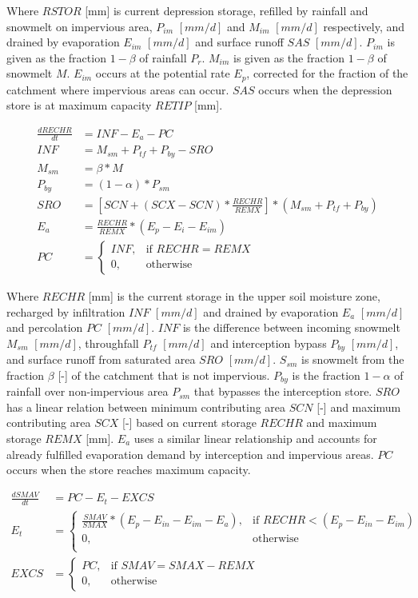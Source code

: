 Where $RSTOR$ [mm] is current depression storage, refilled by rainfall and snowmelt on impervious area, $P_{im}$ $[mm/d]$ and $M_{im}$ $[mm/d]$ respectively, and drained by evaporation $E_{im}$  $[mm/d]$ and surface runoff $SAS$ $[mm/d]$. 
$P_{im}$ is given as the fraction $1-\beta$ of rainfall $P_r$. 
$M_{im}$ is given as the fraction $1-\beta$ of snowmelt $M$.
$E_{im}$ occurs at the potential rate $E_p$, corrected for the fraction of the catchment where impervious areas can occur.
$SAS$ occurs when the depression store is at maximum capacity $RETIP$ [mm].

\begin{align}
	\frac{dRECHR}{dt} &= INF - E_a - PC \\
	INF &= M_{sm} + P_{tf} + P_{by} - SRO\\
	M_{sm} &= \beta*M \\
	P_{by} &= (1-\alpha)*P_{sm}\\
	SRO &= \left[SCN+(SCX-SCN)*\frac{RECHR}{REMX}\right]*\left(M_{sm}+P_{tf} + P_{by}\right) \\
	E_a &= \frac{RECHR}{REMX}*\left(E_p-E_i-E_{im}\right)\\
	PC &= \begin{cases} 
		INF, &\text{if } RECHR = REMX \\
		0, &\text{otherwise}
	\end{cases}
\end{align}

Where $RECHR$ [mm] is the current storage in the upper soil moisture zone, recharged by infiltration $INF$ $[mm/d]$ and drained by evaporation $E_a$ $[mm/d]$ and percolation $PC$ $[mm/d]$.
$INF$ is the difference between incoming snowmelt $M_{sm}$ $[mm/d]$, throughfall $P_{tf}$ $[mm/d]$ and interception bypass $P_{by}$ $[mm/d]$, and surface runoff from saturated area $SRO$ $[mm/d]$. 
$S_{sm}$ is snowmelt from the fraction $\beta$ [-] of the catchment that is not impervious. 
$P_{by}$ is the fraction $1-\alpha$ of rainfall over non-impervious area $P_{sm}$ that bypasses the interception store.
$SRO$ has a linear relation between minimum contributing area $SCN$ [-] and maximum contributing area $SCX$ [-] based on current storage $RECHR$ and maximum storage $REMX$ [mm].
$E_a$ uses a similar linear relationship and accounts for already fulfilled evaporation demand by interception and impervious areas.
$PC$ occurs when the store reaches maximum capacity.

\begin{align}
	\frac{dSMAV}{dt} &= PC-E_t-EXCS\\
	E_t &=  \begin{cases} 
		\frac{SMAV}{SMAX}*\left(E_p-E_{in}-E_{im}-E_a\right), &\text{if } RECHR < \left(E_p-E_{in}-E_{im}\right)\\
		0, &\text{otherwise}\\
	\end{cases} \\
	EXCS &= \begin{cases} 
		PC, &\text{if } SMAV = SMAX-REMX \\
		0, &\text{otherwise}
	\end{cases}
\end{align}

